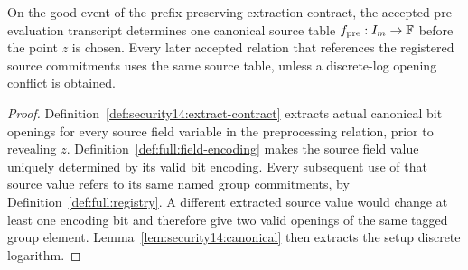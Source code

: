 \begin{lemma}\label{lem:security14:pre-fixed}
On the good event of the
prefix-preserving extraction
contract, the accepted
pre-evaluation transcript
determines one canonical
source table
$f_{\rm pre}:I_m\to\mathbb{F}$
before the point $z$ is chosen.
Every later accepted relation
that references the registered
source commitments uses the
same source table, unless a
discrete-log opening conflict
is obtained.
\end{lemma}
\begin{proof}
Definition~\ref{def:security14:extract-contract}
extracts actual canonical
bit openings for every source
field variable in the
preprocessing relation,
prior to revealing $z$.
Definition~\ref{def:full:field-encoding}
makes the source field value
uniquely determined by its
valid bit encoding.
Every subsequent use of that
source value refers to its
same named group commitments,
by Definition~\ref{def:full:registry}.
A different extracted source
value would change at least
one encoding bit and therefore
give two valid openings of
the same tagged group element.
Lemma~\ref{lem:security14:canonical}
then extracts the setup
discrete logarithm.
\end{proof}

